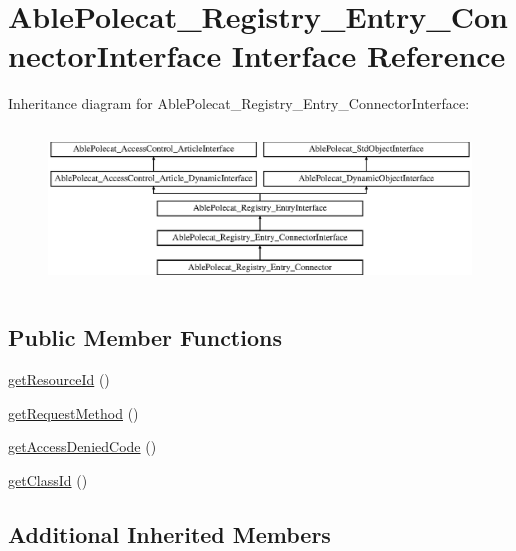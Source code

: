 \hypertarget{interface_able_polecat___registry___entry___connector_interface}{}\section{Able\+Polecat\+\_\+\+Registry\+\_\+\+Entry\+\_\+\+Connector\+Interface Interface Reference}
\label{interface_able_polecat___registry___entry___connector_interface}
Inheritance diagram for Able\+Polecat\+\_\+\+Registry\+\_\+\+Entry\+\_\+\+Connector\+Interface\+:\begin{figure}[H]
\begin{center}
\leavevmode
\includegraphics[height=4.268293cm]{interface_able_polecat___registry___entry___connector_interface}
\end{center}
\end{figure}
\subsection*{Public Member Functions}
\begin{DoxyCompactItemize}
\item 
\hyperlink{interface_able_polecat___registry___entry___connector_interface_a0ac412173b2b1d569ef90a1ac095ca5d}{get\+Resource\+Id} ()
\item 
\hyperlink{interface_able_polecat___registry___entry___connector_interface_ae534469d94a650b89ceb36b968bd3727}{get\+Request\+Method} ()
\item 
\hyperlink{interface_able_polecat___registry___entry___connector_interface_a62bff70fdf72bd7a3e5bd844978d4322}{get\+Access\+Denied\+Code} ()
\item 
\hyperlink{interface_able_polecat___registry___entry___connector_interface_acc9039051a8b6d4fe7c5ddfbaedbcbcb}{get\+Class\+Id} ()
\end{DoxyCompactItemize}
\subsection*{Additional Inherited Members}


